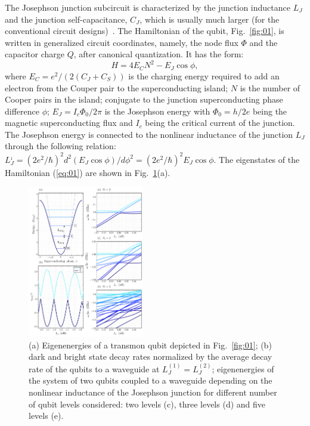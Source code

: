 \documentclass[lettersize,journal]{IEEEtran}
\begin{document}
The Josephson junction subcircuit is characterized by the junction inductance $L_J$ and the junction self-capacitance, $C_J$, which is usually much larger (for the conventional circuit designs)~\cite{krantz_quantum_2019}.
The Hamiltonian of the qubit, Fig.~\ref{fig:01}, is written in generalized circuit coordinates, namely, the node flux $\Phi$ and the capacitor charge $Q$, after canonical quantization.
It has the form:
\begin{equation}\label{eq:01}
    H = 4 E_C N^2 - E_J \cos \phi,
\end{equation}
where $E_C = e^2 / (2 (C_J + C_S))$ is the charging energy required to add an electron from the Couper pair to the superconducting island; $N$ is the number of Cooper pairs in the island; conjugate to the junction superconducting phase difference $\phi$; $E_J = I_c \Phi_0 / 2\pi$ is the Josephson energy with $\Phi_0 = h / 2e$ being the magnetic superconducting flux and $I_c$ being the critical current of the junction.
The Josephson energy is connected to the nonlinear inductance of the junction $L_J$ through the following relation: $L_J^{_1} = (2e^2 / \hbar)^2 d^2(E_J \cos \phi) / d\phi^2 = (2e^2 / \hbar)^2 E_J \cos \phi$. 
The eigenstates of the Hamiltonian (\ref{eq:01}) are shown in Fig.~\ref{fig:02}(a).

\begin{figure}[h]
    \centering
    \includegraphics[width=0.45\textwidth]{fig_2}
    \caption{(a) Eigenenergies of a transmon qubit depicted in Fig.~\ref{fig:01}; (b) dark and bright state decay rates normalized by the average decay rate of the qubits to a waveguide at $L_J^{(1)} = L_J^{(2)}$; eigenenergies of the system of two qubits coupled to a waveguide depending on the nonlinear inductance of the Josephson junction for different number of qubit levels considered: two levels (c), three levels (d) and five levels (e).}
    \label{fig:02}
\end{figure}
\end{document}

